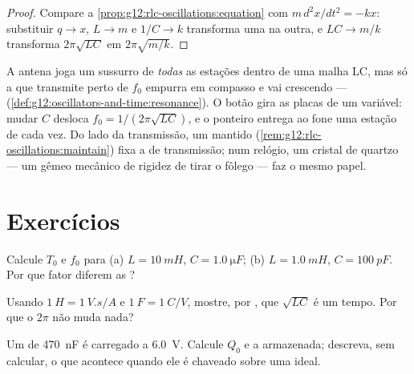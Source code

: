 \begin{proof}
Compare a \cref{prop:g12:rlc-oscillations:equation} com $m\,d^2x/dt^2 = -kx$:
substituir $q \to x$, $L \to m$ e $1/C \to k$ transforma uma na outra, e
$LC \to m/k$ transforma $2\pi\sqrt{LC}$ em $2\pi\sqrt{m/k}$.
\end{proof}

\begin{example}\label{ex:g12:rlc-oscillations:tuning}
A antena joga um sussurro de \emph{todas} as estações dentro de uma malha LC, mas só a
que transmite perto de $f_0$ empurra em compasso e vai crescendo --- 
(\cref{def:g12:oscillators-and-time:resonance}). O botão gira as placas de um 
variável: mudar $C$ desloca $f_0 = 1/(2\pi\sqrt{LC})$, e o ponteiro entrega ao fone uma
estação de cada vez. Do lado da transmissão, um  mantido
(\cref{rem:g12:rlc-oscillations:maintain}) fixa a  de transmissão; num
relógio, um cristal de quartzo --- um gêmeo mecânico de rigidez de tirar o fôlego ---
faz o mesmo papel.
\end{example}

\section{Exercícios}

\begin{exercise}[$\star$]\label{exo:g12:rlc-oscillations:1}
Calcule $T_0$ e $f_0$ para (a) $L = \qty{10}{mH}$, $C = \qty{1.0}{\micro F}$; (b)
$L = \qty{1.0}{mH}$, $C = \qty{100}{pF}$. Por que fator diferem as ?
\end{exercise}

\begin{exercise}[$\star$]\label{exo:g12:rlc-oscillations:2}
Usando $\qty{1}{H} = \qty{1}{V.s/A}$ e $\qty{1}{F} = \qty{1}{C/V}$, mostre,  por
, que $\sqrt{LC}$ é um tempo. Por que o $2\pi$ não muda nada?
\end{exercise}

\begin{exercise}[$\star$]\label{exo:g12:rlc-oscillations:3}
Um  de \qty{470}{nF} é carregado a \qty{6.0}{V}. Calcule $Q_0$ e a 
armazenada; descreva, sem calcular, o que acontece quando ele é chaveado sobre uma
 ideal.
\end{exercise}

